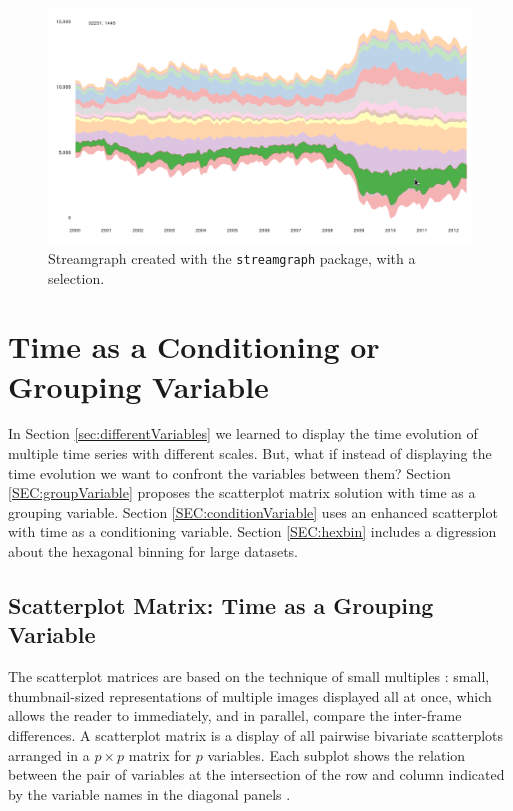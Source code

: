 \documentclass[smallroyalvopaper]{memoir}
\begin{document}
\begin{figure}[htbp]
\centering
\includegraphics[width=.9\linewidth]{figs/streamgraph_interactive_selected.png}
\caption{Streamgraph created with the \texttt{streamgraph} package, with a selection. \label{fig:streamgraph_interactive_selected}}
\end{figure}

\chapter{Time as a Conditioning or Grouping Variable}
\label{sec:org4d61629}
\label{cha:timeGroupFactor}

In Section \ref{sec:differentVariables} we learned to display the time evolution of multiple time series with different scales. But, what if instead of displaying the time evolution we want to confront the variables between them? Section \ref{SEC:groupVariable} proposes the scatterplot matrix solution with time as a grouping variable. Section \ref{SEC:conditionVariable} uses an enhanced scatterplot with time as a conditioning variable. Section \ref{SEC:hexbin} includes a digression about the hexagonal binning for large datasets.

\section{Scatterplot Matrix: Time as a Grouping Variable \label{SEC:groupVariable}}
\label{sec:org13b7715}

The scatterplot matrices are based on the technique of small multiples
\cite{Tufte1990}: small, thumbnail-sized representations of multiple
images displayed all at once, which allows the reader to immediately,
and in parallel, compare the inter-frame differences.  A scatterplot
matrix is a display of all pairwise bivariate scatterplots arranged in
a \(p \times p\) matrix for \(p\) variables. Each subplot shows the
relation between the pair of variables at the intersection of the row
and column indicated by the variable names in the diagonal panels
\cite{Friendly.Denis2005}.
\end{document}
